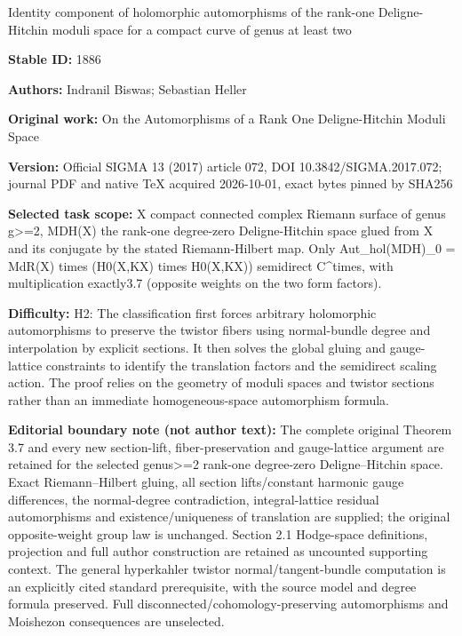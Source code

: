 \documentclass[11pt]{article}
\numberwithin{equation}{section}
\begin{document}
\begin{center}\Large Identity component of holomorphic automorphisms of the rank-one Deligne-Hitchin moduli space for a compact curve of genus at least two\end{center}
\noindent\textbf{Stable ID:} 1886\par
\noindent\textbf{Authors:} Indranil Biswas; Sebastian Heller\par
\noindent\textbf{Original work:} On the Automorphisms of a Rank One Deligne-Hitchin Moduli Space\par
\noindent\textbf{Version:} Official SIGMA 13 (2017) article 072, DOI 10.3842/SIGMA.2017.072; journal PDF and native TeX acquired 2026-10-01, exact bytes pinned by SHA256\par
\noindent\textbf{Selected task scope:} X compact connected complex Riemann surface of genus g>=\allowbreak{}2, MDH(X) the rank-one degree-zero Deligne-Hitchin space glued from X and its conjugate by the stated Riemann-Hilbert map. Only Aut\_hol(MDH)\_0 =\allowbreak{} MdR(X) times (H0(X,KX) times H0(X,KX)) semidirect C\textasciicircum{}times, with multiplication exactly3.7 (opposite weights on the two form factors).\par
\noindent\textbf{Difficulty:} H2: The classification first forces arbitrary holomorphic automorphisms to preserve the twistor fibers using normal-bundle degree and interpolation by explicit sections. It then solves the global gluing and gauge-lattice constraints to identify the translation factors and the semidirect scaling action. The proof relies on the geometry of moduli spaces and twistor sections rather than an immediate homogeneous-space automorphism formula.\par
\noindent\textbf{Editorial boundary note (not author text):} The complete original Theorem 3.7 and every new section-lift, fiber-preservation and gauge-lattice argument are retained for the selected genus>=\allowbreak{}2 rank-one degree-zero Deligne–Hitchin space. Exact Riemann–Hilbert gluing, all section lifts/constant harmonic gauge differences, the normal-degree contradiction, integral-lattice residual automorphisms and existence/uniqueness of translation are supplied; the original opposite-weight group law is unchanged. Section 2.1 Hodge-space definitions, projection and full author construction are retained as uncounted supporting context. The general hyperkahler twistor normal/tangent-bundle computation is an explicitly cited standard prerequisite, with the source model and degree formula preserved. Full disconnected/cohomology-preserving automorphisms and Moishezon consequences are unselected.\par
\end{document}

